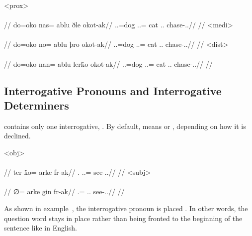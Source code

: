 	\a<prox>\begingl
		\glpreamble{}\\
		\\
		//
		\gla do=oko nas= ablu ðle okot-ak//
		\glb \An.\Sg.\Erg=dog \An.\Pc.\Top= cat \Dem.\Det.\Prox{} chase-\Ind.\Pst.\Pfv//
		\glft{}//
	\endgl
	\a<medi>\begingl
		\glpreamble{}\\
		\\
		//
		\gla do=oko no= ablu þro okot-ak//
		\glb \An.\Sg.\Erg=dog \An.\Sg.\Top= cat \Dem.\Det.\Med{} chase-\Ind.\Pst.\Pfv//
		\glft{}//
	\endgl
	\a<dist>\begingl
		\glpreamble{}\\
		\\
		//
		\gla do=oko nan= ablu lerǩo okot-ak//
		\glb \An.\Sg.\Erg=dog \An.\Pl.\Top= cat \Dem.\Det.\Dist{} chase-\Ind.\Pst.\Pfv//
		\glft{}//
	\endgl
\xe

\subsection{Interrogative Pronouns and Interrogative Determiners}
\label{subsec:tvk-interrogative-pronouns-determiners}

\langtvk{} contains only one interrogative,   . By default,   means  or , depending on how it is declined.

	\a<obj>\begingl
		\glpreamble{}\\
		\\
		//
		\gla ter ǩo= arke fr-ak//
		\glb \Sps.\Abs{} \In.\Sg.\Dat= \Int{} see-\Ind.\Pst.\Pfv//
		\glft{}//
	\endgl
	\a<subj>\begingl
		\glpreamble{}\\
		\\
		//
		\gla ∅= arke gin fr-ak//
		\glb \Sg.\Abs= \Int{} \Tps.\In.\Top{} see-\Ind.\Pst.\Pfv//
		\glft{}//
	\endgl
\xe

As shown in example~, the interrogative pronoun is placed  . In other words, the question word stays in place rather than being fronted to the beginning of the sentence like in English.

